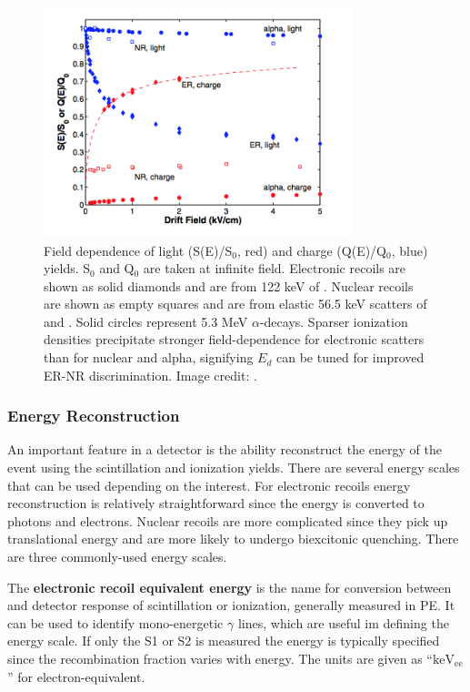 \begin{figure}
\centering
\includegraphics[width=0.8\textwidth]{LYQY}
\caption{Field dependence of light (S(E)/S$_{0}$, red) and charge (Q(E)/Q$_{0}$, blue) yields.  S$_{0}$ and Q$_{0}$ are taken at
infinite field.  Electronic recoils are shown as solid diamonds and are from 122 keV \gammarays of .  Nuclear recoils
are shown as empty squares and are from elastic 56.5 keV scatters of \ambe and .  Solid circles represent 
5.3 MeV $\alpha$-decays.  Sparser ionization densities precipitate stronger field-dependence for electronic scatters than for nuclear and
alpha, signifying $E_{d}$ can be tuned for improved ER-NR discrimination.  Image credit: .}
\label{fig:tpcs_signals_drift_field}
\end{figure}



\subsubsection{Energy Reconstruction}
\label{subsubsec:tpcs_signals_energy}
An important feature in a detector is the ability reconstruct the energy of the event using the scintillation and
ionization yields.  There are several energy scales that can be used depending on the interest.  For electronic recoils energy
reconstruction is relatively straightforward since the energy is converted to photons and electrons.  Nuclear recoils are more
complicated since they pick up translational energy and are more likely to undergo biexcitonic quenching.  There are three commonly-used
energy scales.

The \textbf{electronic recoil equivalent energy} is the name for conversion between \gammaray and detector response of scintillation or
ionization, generally measured in PE.  It can be used to identify mono-energetic $\gamma$ lines, which are useful im defining the energy
scale.  If only the S1 or S2 is measured the energy is typically specified since the recombination fraction varies with energy.  The units
are given as ``$\mathrm{keV_{ee}}$'' for electron-equivalent.

